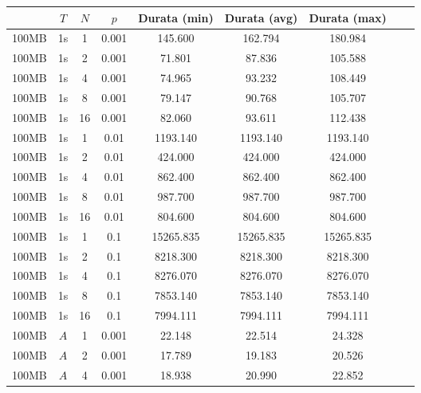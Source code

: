 \begin{figure}[H]
    \centering
    \begin{tabular}{|c|c|c|c|c|c|c|c|c|}
        \hline
        \rowcolor{tblhdrcolor}
        \multicolumn{1}{|c|}{\textbf{Dimensione File}}
                       & \multicolumn{1}{|c|}{\textbf{$T$}}
                       & \multicolumn{1}{|c|}{\textbf{$N$}}
                       & \multicolumn{1}{|c|}{\textbf{$p$}}
                       & \multicolumn{1}{|c|}{\textbf{Durata (min)}}
                       & \multicolumn{1}{|c|}{\textbf{Durata (avg)}}
                       & \multicolumn{1}{|c|}{\textbf{Durata (max)}}
        \\\hline
        100MB & 1s & 1 & 0.001 & 145.600 & 162.794 & 180.984\\\hline
        100MB & 1s & 2 & 0.001 & 71.801 & 87.836 & 105.588\\\hline
        100MB & 1s & 4 & 0.001 & 74.965 & 93.232 & 108.449\\\hline
        100MB & 1s & 8 & 0.001 & 79.147 & 90.768 & 105.707\\\hline
        100MB & 1s & 16 & 0.001 & 82.060 & 93.611 & 112.438\\\hline
        100MB & 1s & 1 & 0.01 & 1193.140 & 1193.140 & 1193.140\\\hline
        100MB & 1s & 2 & 0.01 & 424.000 & 424.000 & 424.000\\\hline
        100MB & 1s & 4 & 0.01 & 862.400 & 862.400 & 862.400\\\hline
        100MB & 1s & 8 & 0.01 & 987.700 & 987.700 & 987.700\\\hline
        100MB & 1s & 16 & 0.01 & 804.600 & 804.600 & 804.600\\\hline
        100MB & 1s & 1 & 0.1 & 15265.835 & 15265.835 & 15265.835\\\hline
        100MB & 1s & 2 & 0.1 & 8218.300 & 8218.300 & 8218.300\\\hline
        100MB & 1s & 4 & 0.1 & 8276.070 & 8276.070 & 8276.070\\\hline
        100MB & 1s & 8 & 0.1 & 7853.140 & 7853.140 & 7853.140\\\hline
        100MB & 1s & 16 & 0.1 & 7994.111 & 7994.111 & 7994.111\\\hline
        100MB & $A$ & 1 & 0.001 & 22.148 & 22.514 & 24.328\\\hline
        100MB & $A$ & 2 & 0.001 & 17.789 & 19.183 & 20.526\\\hline
        100MB & $A$ & 4 & 0.001 & 18.938 & 20.990 & 22.852\\\hline

\end{tabular}
\end{figure}
